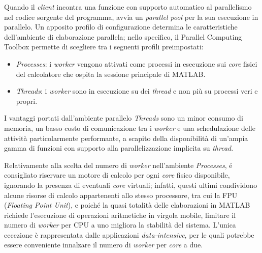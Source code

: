 Quando il \textit{client} incontra una funzione con supporto automatico al parallelismo nel codice sorgente del programma, avvia un \textit{parallel pool} per la sua esecuzione in parallelo. \newline
Un apposito profilo di configurazione determina le caratteristiche dell'ambiente di elaborazione parallela; nello specifico, il Parallel Computing Toolbox permette di scegliere tra i
seguenti profili preimpostati:
\begin{itemize}
    \item \textit{Processes}: i \textit{worker} vengono attivati come processi in esecuzione sui \textit{core} fisici del calcolatore che ospita la sessione
          principale di MATLAB.
    \item \textit{Threads}: i \textit{worker} sono in esecuzione su dei \textit{thread} e non pi\`u su processi veri e propri.
\end{itemize}
I vantaggi portati dall'ambiente
parallelo \textit{Threads} sono un minor consumo di memoria, un basso costo di comunicazione tra i \textit{worker} e una schedulazione delle attivit\`a particolarmente
performante, a scapito della disponibilit\`a di un'ampia gamma di funzioni con supporto alla parallelizzazione implicita su \textit{thread}.

Relativamente alla scelta del numero di \textit{worker} nell'ambiente \textit{Processes}, \'e consigliato riservare un motore di calcolo per ogni \textit{core}
fisico disponibile, ignorando la presenza di eventuali \textit{core} virtuali; infatti, questi ultimi condividono alcune risorse di calcolo appartenenti allo
stesso processore, tra cui la FPU (\textit{Floating Point Unit}), e poich\'e la quasi totalit\`a delle elaborazioni in MATLAB richiede l'esecuzione di operazioni
aritmetiche in virgola mobile, limitare il numero di \textit{worker} per CPU a uno migliora la stabilit\`a del sistema. \newline
L'unica eccezione \`e rappresentata dalle applicazioni \textit{data-intensive}, per le quali potrebbe essere conveniente innalzare il numero di \textit{worker} per
\textit{core} a due.

